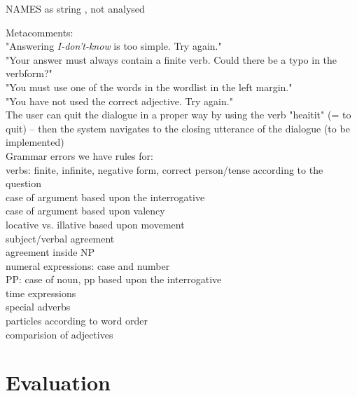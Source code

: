 \documentclass[11pt]{article}
\begin{document}
NAMES as string , not analysed

Metacomments:\\
"Answering \textit{I-don't-know} is too simple. Try again."\\
"Your answer must always contain a finite verb. Could there be a typo in the verbform?"\\
"You must use one of the words in the wordlist in the left margin."\\
"You have not used the correct adjective. Try again." \\
The user can quit the dialogue in a proper way by using the verb "heaitit" (= to quit) -- then the system navigates to the closing utterance of the dialogue (to be implemented)\\

Grammar errors we have rules for:\\
verbs: finite, infinite, negative form, correct person/tense according to the question\\
case of argument based upon the interrogative \\
case of argument based upon valency\\
locative vs. illative based upon movement\\
subject/verbal agreement\\
agreement inside NP \\
numeral expressions: case and number  \\
PP: case of noun, pp based upon the interrogative \\ 
time expressions \\
special adverbs  \\
particles according to word order \\
comparision of adjectives\\

\section{Evaluation}
 
\end{document}
